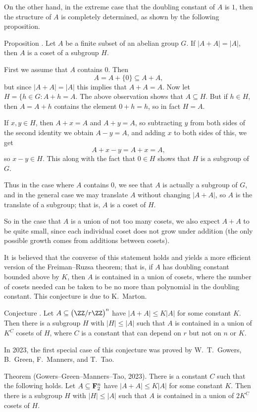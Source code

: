 On the other hand, in the extreme case that the doubling
constant of $A$ is $1$, then the structure of $A$ is completely determined, as shown by the following proposition.

\edef\propdoublingone{\the\sectcount.\the\thmcount}
\proclaim Proposition \advthm. Let $A$ be a finite subset of an abelian group $G$. If $|A+A| = |A|$,
then $A$ is a coset of a subgroup $H$.

\proof First we assume that $A$ contains $0$. Then
$$A = A + \{0\} \subseteq A+A,$$
but since $|A+A| = |A|$ this implies that $A+A = A$. Now let $H = \{h\in G : A + h = A$. The above observation
shows that $A\subseteq H$. But if $h\in H$, then $A = A+h$ contains the element $0+h = h$, so in
fact $H=A$.

If $x,y\in H$, then $A+x = A$ and $A+y=A$, so subtracting $y$ from both sides of the second identity we obtain
$A-y = A$, and adding $x$ to both sides of this, we get
$$A + x-y = A+x = A,$$
so $x-y\in H$.
This along with the fact that $0\in H$ shows that $H$ is a subgroup of $G$.

Thus in the case where $A$ contains $0$, we see that $A$ is actually a subgroup of $G$, and
in the general case we may translate $A$ without changing $|A+A|$, so $A$ is the translate of a subgroup;
that is, $A$ is a coset of $H$.\slug

So in the case that $A$ is a union of not too many cosets, we also expect $A+A$ to be quite small, since
each individual coset does not grow under addition (the only possible growth comes from additions between cosets).

It is believed that the converse of this statement holds and yields a more efficient version
of the Freiman--Ruzsa theorem; that is,
if $A$ has doubling constant bounded above by $K$, then $A$ is contained in a union of cosets,
where the number of cosets needed can be taken to be no more than polynomial in the doubling constant.
This conjecture is due to K.~Marton.

\proclaim Conjecture \advthm. Let $A\subseteq \bigl(\ZZ/r\ZZ\bigr)^n$ have $|A+A|\le K|A|$
for some constant $K$. Then there is a subgroup $H$ with $|H|\le |A|$ such that $A$
is contained in a union of $K^C$ cosets of $H$, where $C$ is a constant that can depend
on $r$ but not on $n$ or $K$.

In 2023, the first special case of this conjecture was proved by W.~T.~Gowers, B.~Green, F.~Manners, and
T.~Tao.

\edef\thmpfr{\the\sectcount.\the\thmcount}
\parenproclaim Theorem {\advthm} (Gowers--Green--Manners--Tao, {\rm 2023}).
There is a constant $C$ such that the following holds.
Let $A\subseteq {\bf F}_2^n$ have $|A+A|\le K|A|$
for some constant $K$. Then there is a subgroup $H$ with $|H|\le |A|$ such that $A$
is contained in a union of $2K^C$ cosets of $H$.


